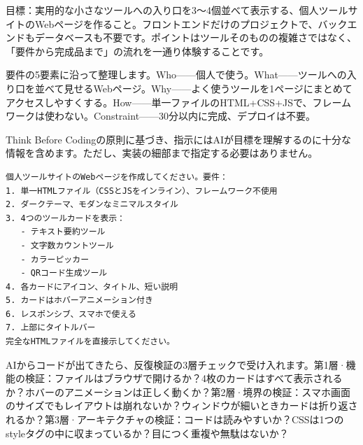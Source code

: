 



目標：実用的な小さなツールへの入り口を3〜4個並べて表示する、個人ツールサイトのWebページを作ること。フロントエンドだけのプロジェクトで、バックエンドもデータベースも不要です。ポイントはツールそのものの複雑さではなく、「要件から完成品まで」の流れを一通り体験することです。

要件の5要素に沿って整理します。Who——個人で使う。What——ツールへの入り口を並べて見せるWebページ。Why——よく使うツールを1ページにまとめてアクセスしやすくする。How——単一ファイルのHTML+CSS+JSで、フレームワークは使わない。Constraint——30分以内に完成、デプロイは不要。


Think Before Codingの原則に基づき、指示にはAIが目標を理解するのに十分な情報を含めます。ただし、実装の細部まで指定する必要はありません。

\begin{lstlisting}
個人ツールサイトのWebページを作成してください。要件：
1. 単一HTMLファイル（CSSとJSをインライン）、フレームワーク不使用
2. ダークテーマ、モダンなミニマルスタイル
3. 4つのツールカードを表示：
   - テキスト要約ツール
   - 文字数カウントツール
   - カラーピッカー
   - QRコード生成ツール
4. 各カードにアイコン、タイトル、短い説明
5. カードはホバーアニメーション付き
6. レスポンシブ、スマホで使える
7. 上部にタイトルバー
完全なHTMLファイルを直接示してください。
\end{lstlisting}


AIからコードが出てきたら、反復検証の3層チェックで受け入れます。第1層·機能の検証：ファイルはブラウザで開けるか？4枚のカードはすべて表示されるか？ホバーのアニメーションは正しく動くか？第2層·境界の検証：スマホ画面のサイズでもレイアウトは崩れないか？ウィンドウが細いときカードは折り返されるか？第3層·アーキテクチャの検証：コードは読みやすいか？CSSは1つのstyleタグの中に収まっているか？目につく重複や無駄はないか？

